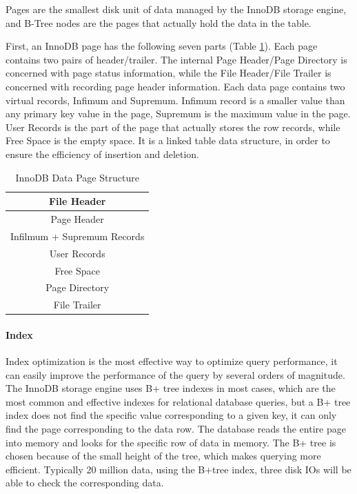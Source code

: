 Pages are the smallest disk unit of data managed by the InnoDB storage engine, and B-Tree nodes are the pages that actually hold the data in the table.

First, an InnoDB page has the following seven parts (Table \ref{tab:innodb_page}). Each page contains two pairs of header/trailer. The internal Page Header/Page Directory is concerned with page status information, while the File Header/File Trailer is concerned with recording page header information. Each data page contains two virtual records, Infimum and Supremum. Infimum record is a smaller value than any primary key value in the page, Supremum is the maximum value in the page\cite{mysql_page}. User Records is the part of the page that actually stores the row records, while Free Space is the empty space. It is a linked table data structure, in order to ensure the efficiency of insertion and deletion.

\begin{table}[hbt!]
\centering
\begin{tabular}{|c|}
\hline
File Header                 \\ \hline
Page Header                 \\ \hline
Infilmum + Supremum Records \\ \hline
User Records                \\ \hline
Free Space                  \\ \hline
Page Directory              \\ \hline
File Trailer                \\ \hline
\end{tabular}
\caption{InnoDB Data Page Structure}
\label{tab:innodb_page}
\end{table}

\paragraph{Index}
Index optimization is the most effective way to optimize query performance, it can easily improve the performance of the query by several orders of magnitude. The InnoDB storage engine uses B+ tree indexes in most cases, which are the most common and effective indexes for relational database queries, but a B+ tree index does not find the specific value corresponding to a given key, it can only find the page corresponding to the data row. The database reads the entire page into memory and looks for the specific row of data in memory.  The B+ tree is chosen because of the small height of the tree, which makes querying more efficient. Typically 20 million data, using the B+tree index, three disk IOs will be able to check the corresponding data\cite{mysql_page}.

